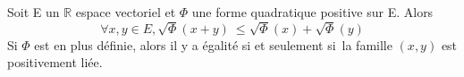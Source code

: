 %
%
\begin{thm}
	 Soit E un $\mathbb{R}$ espace vectoriel
et $\Phi$ une forme quadratique positive sur E. Alors
\[
\forall x,y \in E, \sqrt\Phi(x + y)~
\leq\sqrt\Phi(x) + \sqrt\Phi(y)
\]
%
Si $\Phi$ est en plus définie, alors il y a égalité si et seulement si~la
famille $(x,y)$ est positivement liée.
\end{thm}
%
%
%
%
%
%
%
%
